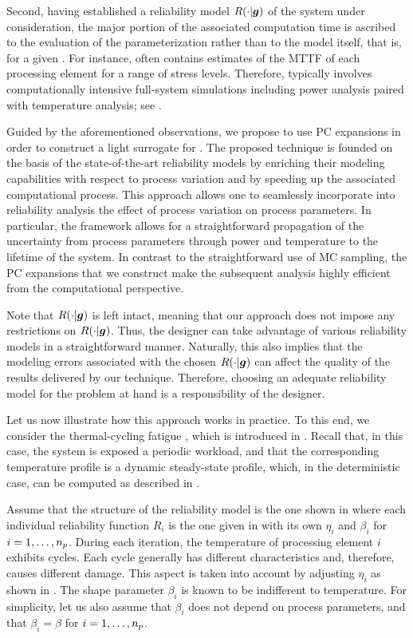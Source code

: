Second, having established a reliability model $R(\cdot | \boldsymbol{g})$ of the system
under consideration, the major portion of the associated computation time is
ascribed to the evaluation of the parameterization \vg rather than to the model
itself, that is, for a given \vg. For instance, \vg often contains estimates of
the \ac{MTTF} of each processing element for a range of stress levels.
Therefore, \vg typically involves computationally intensive full-system
simulations including power analysis paired with temperature analysis; see
.

Guided by the aforementioned observations, we propose to use \ac{PC} expansions
in order to construct a light surrogate for \vg. The proposed technique is
founded on the basis of the state-of-the-art reliability models by enriching
their modeling capabilities with respect to process variation and by speeding up
the associated computational process. This approach allows one to seamlessly
incorporate into reliability analysis the effect of process variation on process
parameters. In particular, the framework allows for a straightforward
propagation of the uncertainty from process parameters through power and
temperature to the lifetime of the system. In contrast to the straightforward
use of \ac{MC} sampling, the \ac{PC} expansions that we construct make the
subsequent analysis highly efficient from the computational perspective.

Note that $R(\cdot | \boldsymbol{g})$ is left intact, meaning that our approach does not
impose any restrictions on $R(\cdot | \boldsymbol{g})$. Thus, the designer can take
advantage of various reliability models in a straightforward manner. Naturally,
this also implies that the modeling errors associated with the chosen $R(\cdot |
\boldsymbol{g})$ can affect the quality of the results delivered by our technique.
Therefore, choosing an adequate reliability model for the problem at hand is a
responsibility of the designer.

Let us now illustrate how this approach works in practice. To this end, we
consider the thermal-cycling fatigue \cite{jedec2016}, which is introduced in
. Recall that, in this case, the system is exposed
a periodic workload, and that the corresponding temperature profile is a dynamic
steady-state profile, which, in the deterministic case, can be computed as
described in .

Assume that the structure of the reliability model is the one shown in
 where each individual reliability function $R_i$ is the
one given in  with its own $\eta_i$ and $\beta_i$ for
$i = 1, \dots, {n_{p}}$. During each iteration, the temperature of processing
element $i$ exhibits  cycles. Each cycle generally has different
characteristics and, therefore, causes different damage. This aspect is taken
into account by adjusting $\eta_i$ as shown in . The
shape parameter $\beta_i$ is known to be indifferent to temperature. For
simplicity, let us also assume that $\beta_i$ does not depend on process
parameters, and that $\beta_i = \beta$ for $i = 1, \dots, {n_{p}}$.

